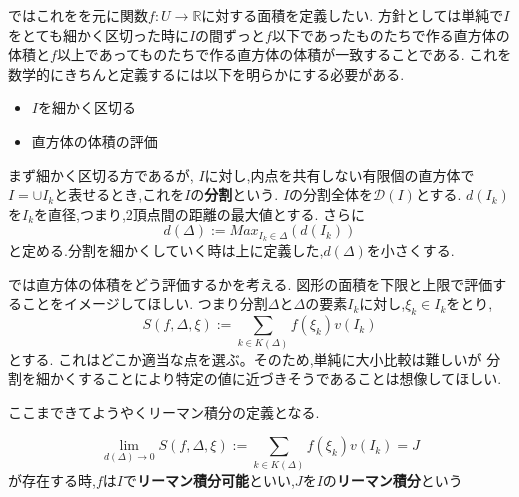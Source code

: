 ではこれをを元に関数$f:U \to \mathbb{R}$に対する面積を定義したい.
方針としては単純で$I$をとても細かく区切った時に$I$の間ずっと$f$以下であったものたちで作る直方体の体積と$f$以上であってものたちで作る直方体の体積が一致することである.
これを数学的にきちんと定義するには以下を明らかにする必要がある.
\begin{itemize}
  \item $I$を細かく区切る
  \item 直方体の体積の評価
\end{itemize}
まず細かく区切る方であるが,
$I$に対し,内点を共有しない有限個の直方体で$I = \cup I_k$と表せるとき,これを$I$の\textbf{分割}という.
$I$の分割全体を$\mathcal{D}(I)$とする.
$d(I_k)$を$I_k$を直径,つまり,2頂点間の距離の最大値とする.
さらに
\begin{equation*}
d(\Delta):= Max_{I_k \in \Delta}(d(I_k))
\end{equation*}
と定める.分割を細かくしていく時は上に定義した,$d(\Delta)$を小さくする.

では直方体の体積をどう評価するかを考える.
図形の面積を下限と上限で評価することをイメージしてほしい.
つまり分割$\Delta$と$\Delta$の要素$I_k$に対し,$\xi_k \in I_k$をとり,
\begin{equation*}
S(f, \Delta, \xi):= \sum_{k \in K(\Delta)} f(\xi_k)v(I_k)
\end{equation*}
とする.
これはどこか適当な点を選ぶ。そのため,単純に大小比較は難しいが
分割を細かくすることにより特定の値に近づきそうであることは想像してほしい.

ここまできてようやくリーマン積分の定義となる.


\begin{screen}
\begin{dfn}
\begin{equation*}
\lim_{d(\Delta) \to 0} S(f, \Delta, \xi):= \sum_{k \in K(\Delta)} f(\xi_k)v(I_k) = J
\end{equation*}
が存在する時,$f$は$I$で\textbf{リーマン積分可能}といい,$J$を$I$の\textbf{リーマン積分}という
\end{dfn}
\end{screen}
